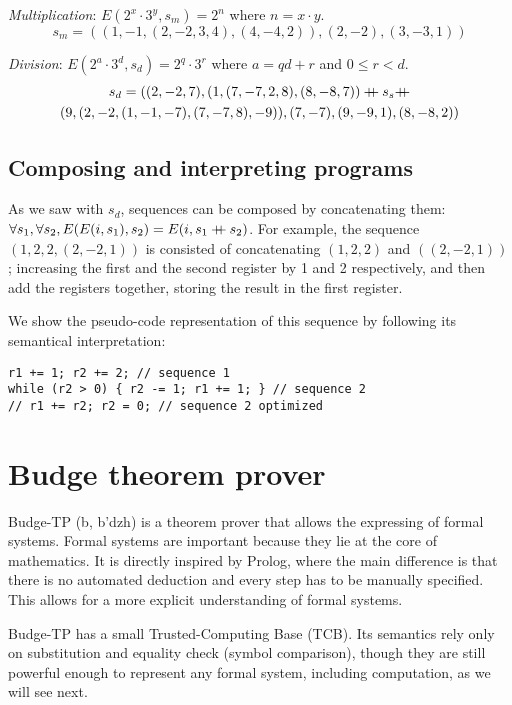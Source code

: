 \documentclass{article}
\newcommand\doubleplus{\mathbin{{+}\mspace{-8mu}{+}}}
\begin{document}
\textit{Multiplication}: $E(2^x \cdot 3^y, s_m) = 2^n$ where $n = x \cdot y$.
$$s_m = ((1, -1, (2, -2, 3, 4), (4, -4, 2)), (2, -2), (3, -3, 1))$$

\textit{Division}: $E(2^a \cdot 3^d, s_d) = 2^q \cdot 3^r$ where $a = qd + r$ and $0 \leq r < d$.
\begin{gather*}
s_d = ((2, -2, 7), (1, (7, -7, 2, 8), (8, -8, 7)) \doubleplus s_s \doubleplus \\ (9, (2, -2, (1, -1, -7), (7, -7, 8), -9)), (7, -7), (9, -9, 1), (8, -8, 2))
\end{gather*}

\subsection{Composing and interpreting programs}

As we saw with $s_d$, sequences can be composed by concatenating them: $\forall s_1, \forall s_2, E(E(i, s_1), s_2) = E(i, s_1 \doubleplus s_2)$. For example, the sequence $(1, 2, 2, (2, -2, 1))$ is consisted of concatenating $(1, 2, 2)$ and $((2, -2, 1))$; increasing the first and the second register by 1 and 2 respectively, and then add the registers together, storing the result in the first register.

We show the pseudo-code representation of this sequence by following its semantical interpretation:

\begin{verbatim}
r1 += 1; r2 += 2; // sequence 1
while (r2 > 0) { r2 -= 1; r1 += 1; } // sequence 2
// r1 += r2; r2 = 0; // sequence 2 optimized
\end{verbatim}

\section{Budge theorem prover}

Budge-TP (b\textturnv\textdyoghlig, b'dzh) is a theorem prover that allows the expressing of formal systems. Formal systems are important because they lie at the core of mathematics. It is directly inspired by Prolog\cite{b5}, where the main difference is that there is no automated deduction and every step has to be manually specified. This allows for a more explicit understanding of formal systems.

Budge-TP has a small Trusted-Computing Base (TCB). Its semantics rely only on substitution and equality check (symbol comparison), though they are still powerful enough to represent any formal system, including computation, as we will see next.
\end{document}
